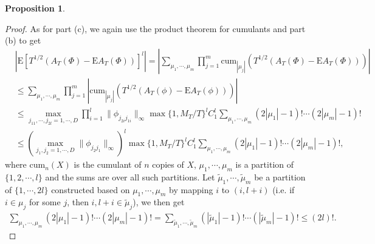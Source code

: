 \documentclass[11pt]{article}
\numberwithin{equation}{section}
\theoremstyle{plain}
\theoremstyle{definition}
\theoremstyle{definition}
\theoremstyle{assumption}
\theoremstyle{proposition}
\newtheorem{proposition}{Proposition}[section]
\theoremstyle{proposition}
\theoremstyle{example}
\theoremstyle{lemma}
\theoremstyle{theorem}
\theoremstyle{remark}
\begin{document}
\begin{proposition}
\begin{proof}
As for part (c), we again use the product theorem for cumulants and part (b) to get
\begin{align*}
&\left|\mathrm{E}\left[T^{1/2}(A_T(\Phi) - \mathrm{E}A_T(\Phi))\right]^l\right|
= \left|\sum_{\mu_1,\cdots,\mu_m} \prod_{j=1}^m \mathrm{cum}_{|\mu_j|}\left(T^{1/2}(A_T(\Phi) - \mathrm{E}A_T(\Phi))\right)\right| \\
&\leqslant \sum_{\mu_1,\cdots,\mu_m} \prod_{j=1}^m \left|\mathrm{cum}_{|\mu_j|}\left(T^{1/2}(A_T(\phi) - \mathrm{E}A_T(\phi))\right)\right| \\
&\leqslant \max_{j_{11},\cdots,j_{2l} = 1,\cdots,D}\prod_{i=1}^l\|\phi_{j_{2i} j_{1i}}\|_{\infty} \max\{1, M_T/T\}^{l} C_1^l\sum_{\mu_1,\cdots,\mu_m} (2|\mu_1|-1)!\cdots(2|\mu_m|-1)! \\
&\leqslant \left(\max_{j_{1},j_{2} = 1,\cdots,D}\|\phi_{j_{2} j_{1}}\|_{\infty}\right)^l \max\{1, M_T/T\}^{l} C_1^l\sum_{\mu_1,\cdots,\mu_m} (2|\mu_1|-1)!\cdots(2|\mu_m|-1)! ,
\end{align*}
where $\mathrm{cum}_{n}(X)$ is the cumulant of $n$ copies of $X$, $\mu_1,\cdots,\mu_m$ is a partition of $\{1,2,\cdots,l\}$ and the sums are over all such partitions. Let $\tilde{\mu}_1,\cdots,\tilde{\mu}_m$ be a partition of $\{1,\cdots,2l\}$ constructed based on $\mu_1,\cdots,\mu_m$ by mapping $i$ to $(i,l+i)$ (i.e. if $i\in\mu_j$ for some $j$, then $i,l+i\in\tilde{\mu}_j$), we then get
\begin{align*}
\sum_{\mu_1,\cdots,\mu_m} (2|\mu_1|-1)!\cdots(2|\mu_m|-1)!
= \sum_{\tilde{\mu}_1,\cdots,\tilde{\mu}_m} (|\tilde{\mu}_1|-1)!\cdots(|\tilde{\mu}_m|-1)!
\leqslant (2l)!.
\end{align*}
\end{proof}
\end{proposition}
\end{document}
